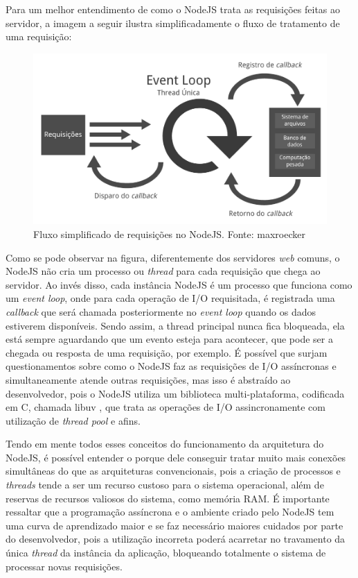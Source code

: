 Para um melhor entendimento de como o NodeJS trata as requisições feitas ao servidor, a imagem a seguir ilustra simplificadamente o fluxo de tratamento de uma requisição:

\begin{figure}[!htb]
	\centering
	\includegraphics[scale=0.6]{imagens/node-eventloop.png}
	\caption{\small Fluxo simplificado de requisições no NodeJS. Fonte: maxroecker \cite{img-eventloop}}
	\label{fig:node-eventloop}
\end{figure}

Como se pode observar na figura, diferentemente dos servidores \textit{web} comuns, o NodeJS não cria um processo ou \textit{thread} para cada requisição que chega ao servidor. Ao invés disso, cada instância NodeJS é um processo que funciona como um \textit{event loop}, onde para cada operação de I/O requisitada, é registrada uma \textit{callback} que será chamada posteriormente no \textit{event loop} quando os dados estiverem disponíveis. Sendo assim, a thread principal nunca fica bloqueada, ela está sempre aguardando que um evento esteja para acontecer, que pode ser a chegada ou resposta de uma requisição, por exemplo. É possível que surjam questionamentos sobre como o NodeJS faz as requisições de I/O assíncronas e simultaneamente atende outras requisições, mas isso é abstraído ao desenvolvedor, pois o NodeJS utiliza um biblioteca multi-plataforma, codificada em C, chamada libuv \cite{libuv}, que trata as operações de I/O assincronamente com utilização de \textit{thread pool} e afins.

Tendo em mente todos esses conceitos do funcionamento da arquitetura do NodeJS, é possível entender o porque dele conseguir tratar muito mais conexões simultâneas do que as arquiteturas convencionais, pois a criação de processos e \textit{threads} tende a ser um recurso custoso para o sistema operacional, além de reservas de recursos valiosos do sistema, como memória RAM. É importante ressaltar que a programação assíncrona e o ambiente criado pelo NodeJS tem uma curva de aprendizado maior e se faz necessário maiores cuidados por parte do desenvolvedor, pois a utilização incorreta poderá acarretar no travamento da única \textit{thread} da instância da aplicação, bloqueando totalmente o sistema de processar novas requisições. 

